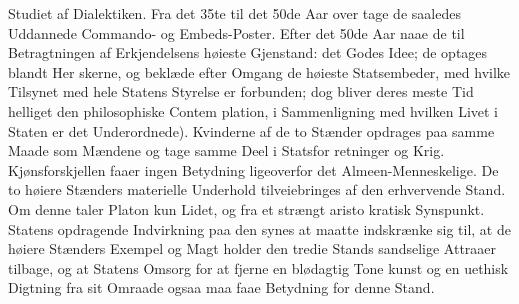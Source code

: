 \documentclass[12pt,a4paper]{book}
\newcommand{\gk}[1]{\textit{#1}}
\begin{document}
Studiet af Dialektiken. Fra det 35te til det 50de Aar over\-%
tage de saaledes Uddannede Commando- og Embeds-Poster.
Efter det 50de Aar naae de til Betragtningen af Erkjendelsens
høieste Gjenstand: det Godes Idee; de optages blandt Her\-%
skerne, og beklæde efter Omgang de høieste Statsembeder,
med hvilke Tilsynet med hele Statens Styrelse er forbunden;
dog bliver deres meste Tid helliget den philosophiske Contem\-%
plation, i Sammenligning med hvilken Livet i Staten er det
Underordnede). Kvinderne af de to Stænder opdrages paa
samme Maade som Mændene og tage samme Deel i Statsfor\-%
retninger og Krig. Kjønsforskjellen faaer ingen Betydning
ligeoverfor det Almeen-Menneskelige. De to høiere Stænders
materielle Underhold tilveiebringes af den erhvervende Stand.
Om denne taler Platon kun Lidet, og fra et strængt aristo\-%
kratisk Synspunkt. Statens opdragende Indvirkning paa den
synes at maatte indskrænke sig til, at de høiere Stænders
Exempel og Magt holder den tredie Stands sandselige Attraaer
tilbage, og at Statens Omsorg for at fjerne en blødagtig Tone\-%
kunst og en uethisk Digtning fra sit Omraade ogsaa maa faae
Betydning for denne Stand.
\end{document}
